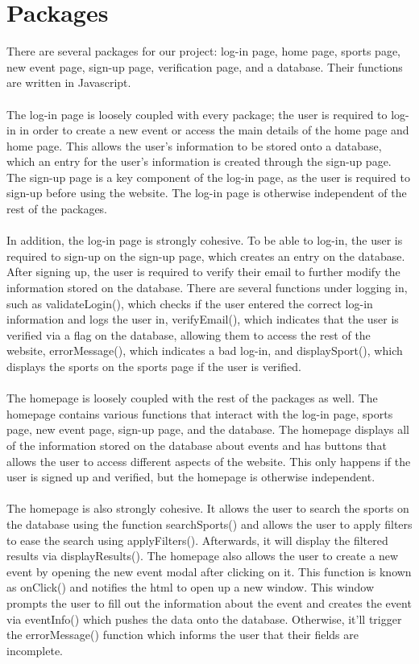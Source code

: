\documentclass[a4paper]{article}
\begin{document}
\section{Packages}
There are several packages for our project: log-in page, home page, sports page, new event page, sign-up page, verification page, and a database. Their functions are written in Javascript.\\
\\
The log-in page is loosely coupled with every package; the user is required to log-in in order to create a new event or access the main details of the home page and home page. This allows the user's information to be stored onto a database, which an entry for the user's information is created through the sign-up page. The sign-up page is a key component of the log-in page, as the user is required to sign-up before using the website. The log-in page is otherwise independent of the rest of the packages.\\
\\
In addition, the log-in page is strongly cohesive. To be able to log-in, the user is required to sign-up on the sign-up page, which creates an entry on the database. After signing up, the user is required to verify their email to further modify the information stored on the database. There are several functions under logging in, such as validateLogin(), which checks if the user entered the correct log-in information and logs the user in, verifyEmail(), which indicates that the user is verified via a flag on the database, allowing them to access the rest of the website, errorMessage(), which indicates a bad log-in, and displaySport(), which displays the sports on the sports page if the user is verified.\\
\\
The homepage is loosely coupled with the rest of the packages as well. The homepage contains various functions that interact with the log-in page, sports page, new event page, sign-up page, and the database. The homepage displays all of the information stored on the database about events and has buttons that allows the user to access different aspects of the website. This only happens if the user is signed up and verified, but the homepage is otherwise independent.\\
\\
The homepage is also strongly cohesive. It allows the user to search the sports on the database using the function searchSports() and allows the user to apply filters to ease the search using applyFilters(). Afterwards, it will display the filtered results via displayResults(). The homepage also allows the user to create a new event by opening the new event modal after clicking on it. This function is known as onClick() and notifies the html to open up a new window. This window prompts the user to fill out the information about the event and creates the event via eventInfo() which pushes the data onto the database. Otherwise, it'll trigger the errorMessage() function which informs the user that their fields are incomplete.\\
\newpage
\end{document}

